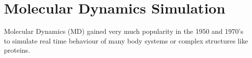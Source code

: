 \section{Molecular Dynamics Simulation}
Molecular Dynamics (MD) gained very much popularity in the 1950 and 1970's to simulate real time behaviour of many body systems or complex structures like proteins.
